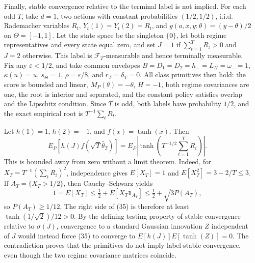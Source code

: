 Finally, stable convergence relative to the terminal label is not implied. For each odd \(T\), take \(d=1\), two actions with constant probabilities \((1/2,1/2)\), i.i.d. Rademacher variables \(R_t\), \(Y_t(1)=Y_t(2)=R_t\), and \(g(a,x,y;\theta)=(y-\theta)/2\) on \(\Theta=[-1,1]\). Let the state space be the singleton \(\{0\}\), let both regime representatives and every state equal zero, and set \(J=1\) if \(\sum_{t=1}^TR_t>0\) and \(J=2\) otherwise. This label is \(\mathcal F_T\)-measurable and hence terminally measurable. Fix any \(\varepsilon<1/2\), and take common envelopes \(B=D_1=D_2=h_-=L_\Pi=\omega_-=1\), \(\kappa(u)=u\), \(s_\Theta=1\), \(\rho=\varepsilon/8\), and \(r_T=\delta_T=0\). All class primitives then hold: the score is bounded and linear, \(M_P(\theta)=-\theta\), \(H=-1\), both regime covariances are one, the root is interior and separated, and the constant policy satisfies overlap and the Lipschitz condition. Since \(T\) is odd, both labels have probability \(1/2\), and the exact empirical root is \(T^{-1}\sum_tR_t\).

Let \(h(1)=1\), \(h(2)=-1\), and \(f(x)=\tanh(x)\). Then
\[
 E_P\!\left[h(J)f\!\left(\sqrt T\widehat\theta_T\right)\right]
 =E_P\left|\tanh\left(T^{-1/2}\sum_{t=1}^TR_t\right)\right|. \tag{35}
\]
This is bounded away from zero without a limit theorem. Indeed, for \(X_T=T^{-1}(\sum_tR_t)^2\), independence gives \(E[X_T]=1\) and \(E[X_T^2]=3-2/T\le3\). If \(A_T=\{X_T>1/2\}\), then Cauchy--Schwarz yields
\[
 1=E[X_T]\le\tfrac12+E[X_T\mathbf 1_{A_T}]
 \le\tfrac12+\sqrt{3P(A_T)},
\]
so \(P(A_T)\ge1/12\). The right side of (35) is therefore at least \(\tanh(1/\sqrt2)/12>0\). By the defining testing property of stable convergence relative to \(\sigma(J)\), convergence to a standard Gaussian innovation \(Z\) independent of \(J\) would instead force (35) to converge to \(E[h(J)]E[\tanh(Z)]=0\). The contradiction proves that the primitives do not imply label-stable convergence, even though the two regime covariance matrices coincide.